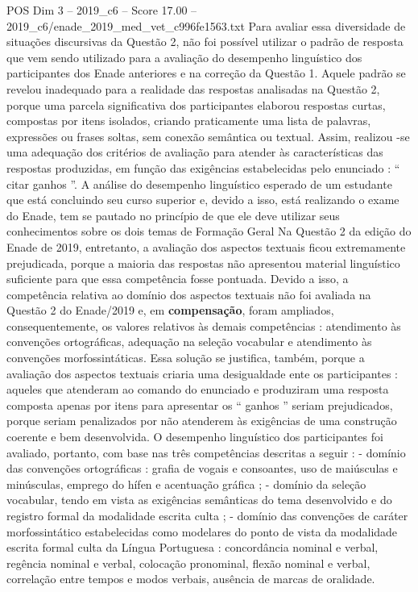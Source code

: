 \begin{textsample}{POS Dim 3 – 2019\_c6 – Score 17.00 – 2019\_c6/enade\_2019\_med\_vet\_c996fe1563.txt}
Para avaliar essa diversidade de situações discursivas da Questão 2, não foi possível utilizar o padrão de resposta que vem sendo utilizado para a avaliação do desempenho linguístico dos participantes dos Enade anteriores e na correção da Questão 1.
Aquele padrão se revelou inadequado para a realidade das respostas analisadas na Questão 2, porque uma parcela significativa dos participantes elaborou respostas curtas, compostas por itens isolados, criando praticamente uma lista de palavras, expressões ou frases soltas, sem conexão semântica ou textual.
Assim, realizou -se uma adequação dos critérios de avaliação para atender às características das respostas produzidas, em função das exigências estabelecidas pelo enunciado : “ citar ganhos ”.
A análise do desempenho linguístico esperado de um estudante que está concluindo seu curso superior e, devido a isso, está realizando o exame do Enade, tem se pautado no princípio de que ele deve utilizar seus conhecimentos sobre os dois temas de Formação Geral Na Questão 2 da edição do Enade de 2019, entretanto, a avaliação dos aspectos textuais ficou extremamente prejudicada, porque a maioria das respostas não apresentou material linguístico suficiente para que essa competência fosse pontuada.
Devido a isso, a competência relativa ao domínio dos aspectos textuais não foi avaliada na Questão 2 do Enade/2019 e, em \textbf{compensação}, foram ampliados, consequentemente, os valores relativos às demais competências : atendimento às convenções ortográficas, adequação na seleção vocabular e atendimento às convenções morfossintáticas.
Essa solução se justifica, também, porque a avaliação dos aspectos textuais criaria uma desigualdade ente os participantes : aqueles que atenderam ao comando do enunciado e produziram uma resposta composta apenas por itens para apresentar os “ ganhos ” seriam prejudicados, porque seriam penalizados por não atenderem às exigências de uma construção coerente e bem desenvolvida.
O desempenho linguístico dos participantes foi avaliado, portanto, com base nas três competências descritas a seguir : - domínio das convenções ortográficas : grafia de vogais e consoantes, uso de maiúsculas e minúsculas, emprego do hífen e acentuação gráfica ; - domínio da seleção vocabular, tendo em vista as exigências semânticas do tema desenvolvido e do registro formal da modalidade escrita culta ; - domínio das convenções de caráter morfossintático estabelecidas como modelares do ponto de vista da modalidade escrita formal culta da Língua Portuguesa : concordância nominal e verbal, regência nominal e verbal, colocação pronominal, flexão nominal e verbal, correlação entre tempos e modos verbais, ausência de marcas de oralidade.

\end{textsample}
